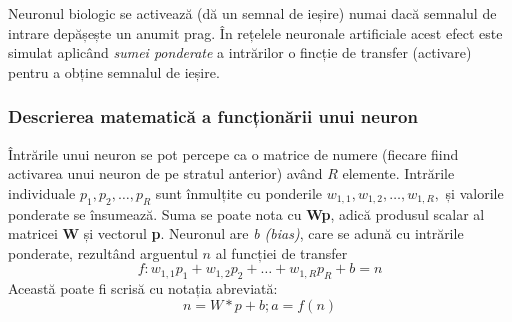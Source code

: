 Neuronul biologic se activează (dă un semnal de ieșire) numai dacă semnalul de intrare depășește un anumit prag. În rețelele neuronale artificiale acest efect este simulat aplicând \textit{sumei ponderate} a intrărilor o fincție de transfer (activare) pentru a obține semnalul de ieșire.



\subsubsection{Descrierea matematică a funcționării unui neuron}
Întrările unui neuron se pot percepe ca o matrice de numere (fiecare fiind activarea unui neuron de pe stratul anterior) având $R$ elemente. Intrările individuale $p_1, p_2, \dots, p_R$ sunt înmulțite cu ponderile $w_{1,1}, w_{1,2}, \dots, w_{1,R},$ și valorile ponderate se însumează. Suma se poate nota cu \textbf{Wp}, adică produsul scalar al matricei \textbf{W} și vectorul \textbf{p}.\newline
Neuronul are \textit{ b (bias)}, care se adună cu intrările ponderate, rezultând arguentul $n$ al funcției de transfer
\begin{equation}
f: w_{1,1}p_1 + w_{1,2}p_2 + \dots + w_{1,R}p_R + b = n
\end{equation}
Această poate fi scrisă cu notația abreviată:
\begin{equation}
n = W*p + b; a = f(n)
\end{equation}


